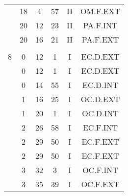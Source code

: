 \documentclass[12pt, a4paper]{article}
\begin{document}
\begin{multicols}{3}
{\begin{tabular}{c c c c c c}
	 	 	 	 & 18 & 4 & 57 & II & OM.F.EXT\\%
	 	 	 	 & 20 & 12 & 23 & II & PA.F.INT\\%
	 	 	 	 & 20 & 16 & 21 & II & PA.F.EXT\\%
	 	 	 	 & & & & & \\%
	 	 	 	8 & 0 & 12 & 1 & I & EC.D.EXT\\%
	 	 	 	 & 0 & 12 & 1 & I & EC.D.EXT\\%
	 	 	 	 & 0 & 14 & 55 & I & EC.D.INT\\%
	 	 	 	 & 1 & 16 & 25 & I & OC.D.EXT\\%
	 	 	 	 & 1 & 20 & 1 & I & OC.D.INT\\%
	 	 	 	 & 2 & 26 & 58 & I & EC.F.INT\\%
	 	 	 	 & 2 & 29 & 50 & I & EC.F.EXT\\%
	 	 	 	 & 2 & 29 & 50 & I & EC.F.EXT\\%
	 	 	 	 & 3 & 32 & 3 & I & OC.F.INT\\%
	 	 	 	 & 3 & 35 & 39 & I & OC.F.EXT\\%
	 	 \end{tabular}
 	}
\end{multicols}
\end{document}
